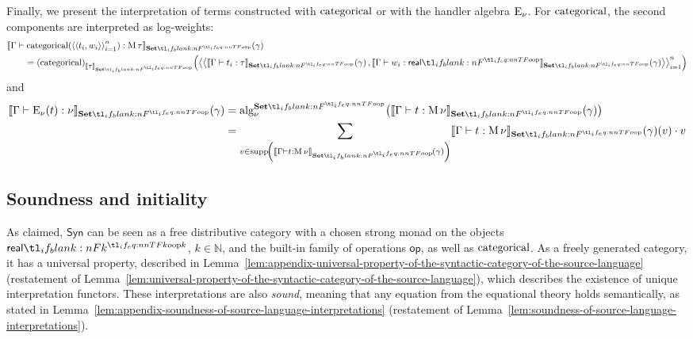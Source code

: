 \documentclass[11pt,a4paper]{article}
\theoremstyle{definition}
\theoremstyle{remark}
\providecommand{\N}{\mathbb{N}}
\providecommand{\Syn}{\mathsf{Syn}}
\providecommand{\srcop}{\mathsf{op}}
\providecommand{\setint}[1]{\llbracket #1\rrbracket_{\Set}}
\providecommand{\categ}{\operatorname{categorical}}
\begin{document}
Finally, we present the interpretation of terms constructed with \( \opn[b]{categorical} \) or with the handler algebra \( \opn[b]{E}_{\nu} \). For \( \opn[b]{categorical} \), the second components are interpreted as log-weights:
\begin{equation*}
  \begin{aligned}
    &\fn[n]{ \setint{\Gamma \vdash \fn[n]{ \opn[b]{categorical} }{ \tuple{ \tuple{ t_{i}, w_{i} } }_{i = 1}^{n} } : \opn[b]{M} \tau} }{ \gamma }
    \\
    &\qquad =
      \fn[n]{ \Nat[nn]{ \categ }{ \setint{\tau} } }{
      \tuple{
        \tuple{
          \fn[n]{ \setint{\Gamma \vdash t_{i} : \tau} }{ \gamma },
          \fn[n]{ \setint{\Gamma \vdash w_{i} : \srcreal} }{ \gamma }
        }
      }_{i = 1}^{n}
      }
  \end{aligned}
\end{equation*}
and
\begin{equation*}
  \begin{aligned}
    \fn[n]{ \setint{\Gamma \vdash \fn[n]{ \opn[b]{E}_{\nu} }{ t } : \nu }}{ \gamma }
    &=
    \fn[n]{ \opn{alg}^{\Set}_{\nu} }{
    \fn[n]{ \setint{\Gamma \vdash t : \opn[b]{M} \nu} }{ \gamma }
    }
    \\
    &=
      \sum_{
      v \in 
      \opn{supp}\!
      \left(
      \fn[n]{ \setint{\Gamma \vdash t : \opn[b]{M} \nu} }{ \gamma }
      \right)
      }
      \fn[n]{
      \fn[n]{ \setint{\Gamma \vdash t : \opn[b]{M} \nu} }{ \gamma }
      }{ v }
      \cdot v
  \end{aligned}
\end{equation*}

\subsection{Soundness and initiality}

As claimed, \( \Syn \) can be seen as a free distributive category with a chosen strong monad on the objects \( \srcreal[k] \), \( k \in \N \), and the built-in family of operations \( \srcop \), as well as \( \opn[b]{categorical} \). As a freely generated category, it has a universal property, described in Lemma~\ref{lem:appendix-universal-property-of-the-syntactic-category-of-the-source-language} (restatement of Lemma~\ref{lem:universal-property-of-the-syntactic-category-of-the-source-language}), which describes the existence of unique interpretation functors. These interpretations are also \emph{sound}, meaning that any equation from the equational theory holds semantically, as stated in Lemma~\ref{lem:appendix-soundness-of-source-language-interpretations} (restatement of Lemma~\ref{lem:soundness-of-source-language-interpretations}).
\end{document}
